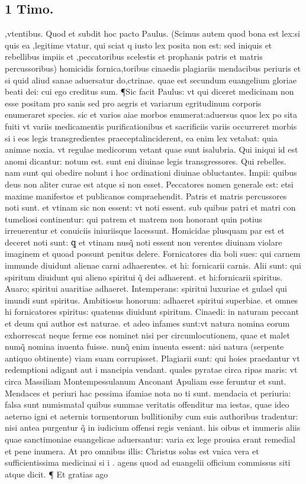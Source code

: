 \documentclass{article}
\begin{document}
\begin{pages}
\section*{1 Timo. }
\marginpar{[ p.202 ]}\pstart ,vtentibus. Quod et subdit hoc pacto Paulus. (Scimus autem quod bona est lex:si quis ea ,legitime vtatur, qui sciat q iusto lex posita non est: sed iniquis et rebellibus impiis et ,peccatoribus scelestis et prophanis patris et matris percussoribus) homicidis fornica,toribus cinaedis plagiariis mendacibus periuris et si quid aliud sanae aduersatur do,ctrinae. quae est secundum euangelium gloriae beati dei: cui ego creditus sum. ¶Sic facit Paulus: vt qui diceret medicinam non esse positam pro sanis sed pro aegris et variarum egritudinum corporis enumeraret species. sic et varios aiae morbos enumerat:aduersus quos lex po sita fuiti vt variis medicamentis purificationibus et sacrificiis variis occurreret morbis  si i eos legis transgredientes praeceptalinciderent, ea enim lex vetabat: quia animae noxia. vt regulae medicorum vetant quae sunt isalubria. Qui iniqui id est anomi dicantur: notum est. sunt eni diuinae legis transgressores. Qui rebelles. nam sunt qui obedire nolunt i hoc ordinationi diuinae obluctantes. Impii: quibus deus non aliter curae est atque si non esset. Peccatores nomen generale est: etsi maxime manifestos et publicanos compraehendit. Patris et matris percussores noti sunt. et vtinam sic non essent: vt noti essent. sub quibus patri et matri con tumeliosi continentur: qui patrem et matrem non honorant quin potius irreuerentur et conuiciis  iniuriisque lacessunt. Homicidae plusquam par est et deceret noti sunt: ꝗ et vtinam nusq̃ noti essent  non verentes diuinam violare imaginem et quoad possunt penitus delere. Fornicatores dia boli sues: qui carnem immunde diuidunt alienae carni adhaerentes. et hi: fornicarii carnis. Alii sunt: qui spiritum diuidunt qui alieno spiritui q̃ dei adhaerent. et hi:fornicarii spiritus. Auaro; spiritui auaritiae adhaeret. Intemperans: spiritui luxuriae et gulael qui imundi sunt spiritus. Ambitiosus honorum: adhaeret spiritui superbiae. et omnes hi fornicatores spiritus: quatenus diuidunt spiritum. Cinaedi: in naturam peccant et deum qui author est naturae. et adeo infames sunt:vt natura nomina eorum exhorrescat neque ferme eos nominet nisi per circumlocutionem, quae et malet numq̃ nomina inuenta fuisse. nunq̃ enim inuenta essent: nisi natura (serpente antiquo obtinente) viam suam corrupisset. Plagiarii sunt: qui hoies praedantur vt redemptioni adigant aut i mancipia vendant. quales pyratae circa ripas maris: vt circa Massiliam Montempessulanum Anconant Apuliam esse feruntur et sunt. Mendaces et periuri hac pessima ifamiae nota no ti sunt. mendacia et periuria: falsa sunt numismatal quibus summae veritatis offenditur ma iestas, quae ideo aeterno igni et aeternis tormentorum bullitioniby cum suis authoribus tradentur: nisi antea purgentur q̃ in iudicium offensi regis veniant. his oibus et inumeris aliis quae sanctimoniae euangelicae aduersantur: varia ex lege prouisa erant remedial et pene inumera. At pro omnibus illis: Christus solus est vnica vera et sufficientissima medicinai si i . agens quod ad euangelii officium commissus siti atque dicit. ¶ Et gratias ago 
\end{pages}
\end{document}

